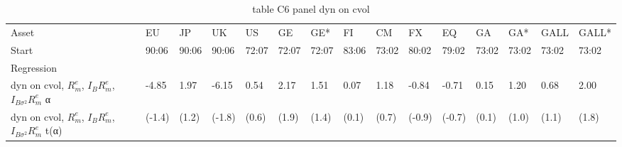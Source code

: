 \begin{table}[htbp]
  \centering
  \caption{table C6 panel dyn on cvol}
  \label{tab:table_C6_panel_dyn_on_cvol}
  \begin{tabular}{lllllllllllllll}
\toprule
Asset & EU & JP & UK & US & GE & GE* & FI & CM & FX & EQ & GA & GA* & GALL & GALL* \\
Start & 90:06 & 90:06 & 90:06 & 72:07 & 72:07 & 72:07 & 83:06 & 73:02 & 80:02 & 79:02 & 73:02 & 73:02 & 73:02 & 73:02 \\
Regression &  &  &  &  &  &  &  &  &  &  &  &  &  &  \\
\midrule
dyn on cvol, $R^e_m$, $I_B R^e_m$, $I_{B\sigma^2} R^e_m$ α & -4.85 & 1.97 & -6.15 & 0.54 & 2.17 & 1.51 & 0.07 & 1.18 & -0.84 & -0.71 & 0.15 & 1.20 & 0.68 & 2.00 \\
dyn on cvol, $R^e_m$, $I_B R^e_m$, $I_{B\sigma^2} R^e_m$ t(α) & (-1.4) & (1.2) & (-1.8) & (0.6) & (1.9) & (1.4) & (0.1) & (0.7) & (-0.9) & (-0.7) & (0.1) & (1.0) & (1.1) & (1.8) \\
\bottomrule
\end{tabular}

\end{table}
